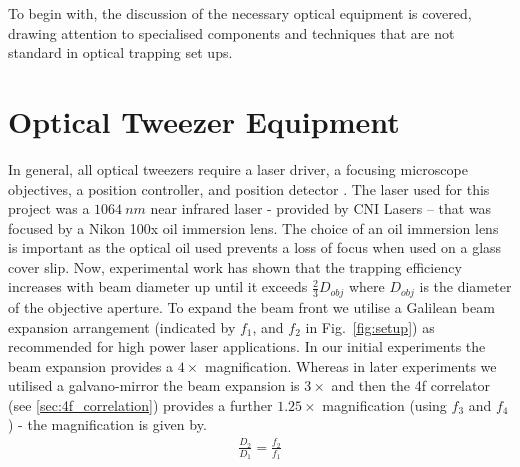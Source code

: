 To begin with, the discussion of the necessary optical equipment is 
covered, drawing attention to specialised components and techniques 
that are not standard in optical trapping set ups.
\section{Optical Tweezer Equipment}
In general, all optical tweezers require a laser driver, a focusing 
microscope objectives, a position controller, and position detector 
\cite{Gieseler2020}. The laser used for this project was a $1064\ 
nm$ near infrared laser - provided by CNI Lasers – that was focused 
by a Nikon 100x oil immersion lens. The choice of an oil immersion 
lens is important as the optical oil used prevents a loss of focus 
when used on a glass cover slip. Now, experimental work has shown 
that the trapping efficiency increases with beam diameter up until 
it exceeds $\frac{2}{3}D_{obj}$ \cite{kim2003dependence} where 
$D_{obj}$ is the diameter of the objective aperture. To expand the 
beam front we utilise a Galilean beam expansion arrangement 
(indicated by $f_1$, and $f_2$ in Fig.~\ref{fig:setup}) as recommended 
for high power laser applications. In our initial experiments the 
beam expansion provides a $4\times$ magnification. Whereas in later 
experiments we utilised a galvano-mirror the beam expansion is 
$3\times$ and then the 4f correlator (see \ref{sec:4f_correlation})
provides a further $1.25\times$ magnification (using $f_3$ and $f_4$) 
- the magnification is given by.
\begin{align}
	\frac{D_2}{D_1} = \frac{f_2}{f_1}
\end{align}

